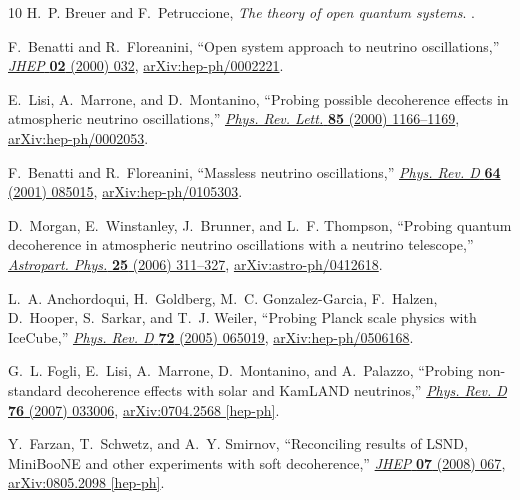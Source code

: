 \documentclass[aps, prd, onecolumn, tightenlines, notitlepage, superscriptaddress, nofootinbib, preprintnumbers, floatfix,showkeys,11pt]{revtex4-2}
\begin{document}
\begin{thebibliography}{10}
H.~P. Breuer and F.~Petruccione, {\em {The theory of open quantum systems}}.
.

F.~Benatti and R.~Floreanini, ``{Open system approach to neutrino
  oscillations},'' \href{http://dx.doi.org/10.1088/1126-6708/2000/02/032}{{\em
  JHEP} {\bfseries 02} (2000) 032},
  \href{http://arxiv.org/abs/hep-ph/0002221}{{\ttfamily arXiv:hep-ph/0002221}}.

E.~Lisi, A.~Marrone, and D.~Montanino, ``{Probing possible decoherence effects
  in atmospheric neutrino oscillations},''
  \href{http://dx.doi.org/10.1103/PhysRevLett.85.1166}{{\em Phys. Rev. Lett.}
  {\bfseries 85} (2000) 1166--1169},
  \href{http://arxiv.org/abs/hep-ph/0002053}{{\ttfamily arXiv:hep-ph/0002053}}.

F.~Benatti and R.~Floreanini, ``{Massless neutrino oscillations},''
  \href{http://dx.doi.org/10.1103/PhysRevD.64.085015}{{\em Phys. Rev. D}
  {\bfseries 64} (2001) 085015},
  \href{http://arxiv.org/abs/hep-ph/0105303}{{\ttfamily arXiv:hep-ph/0105303}}.

D.~Morgan, E.~Winstanley, J.~Brunner, and L.~F. Thompson, ``{Probing quantum
  decoherence in atmospheric neutrino oscillations with a neutrino
  telescope},''
  \href{http://dx.doi.org/10.1016/j.astropartphys.2006.03.001}{{\em Astropart.
  Phys.} {\bfseries 25} (2006) 311--327},
  \href{http://arxiv.org/abs/astro-ph/0412618}{{\ttfamily
  arXiv:astro-ph/0412618}}.

L.~A. Anchordoqui, H.~Goldberg, M.~C. Gonzalez-Garcia, F.~Halzen, D.~Hooper,
  S.~Sarkar, and T.~J. Weiler, ``{Probing Planck scale physics with IceCube},''
  \href{http://dx.doi.org/10.1103/PhysRevD.72.065019}{{\em Phys. Rev. D}
  {\bfseries 72} (2005) 065019},
  \href{http://arxiv.org/abs/hep-ph/0506168}{{\ttfamily arXiv:hep-ph/0506168}}.

G.~L. Fogli, E.~Lisi, A.~Marrone, D.~Montanino, and A.~Palazzo, ``{Probing
  non-standard decoherence effects with solar and KamLAND neutrinos},''
  \href{http://dx.doi.org/10.1103/PhysRevD.76.033006}{{\em Phys. Rev. D}
  {\bfseries 76} (2007) 033006},
  \href{http://arxiv.org/abs/0704.2568}{{\ttfamily arXiv:0704.2568 [hep-ph]}}.

Y.~Farzan, T.~Schwetz, and A.~Y. Smirnov, ``{Reconciling results of LSND,
  MiniBooNE and other experiments with soft decoherence},''
  \href{http://dx.doi.org/10.1088/1126-6708/2008/07/067}{{\em JHEP} {\bfseries
  07} (2008) 067}, \href{http://arxiv.org/abs/0805.2098}{{\ttfamily
  arXiv:0805.2098 [hep-ph]}}.


\end{thebibliography}
\end{document}
